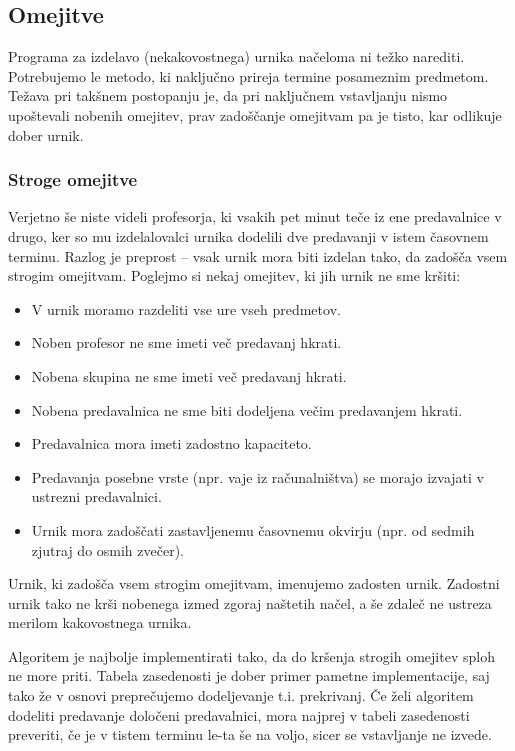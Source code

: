 \documentclass[a4paper,10pt]{article}
\begin{document}
\subsection{Omejitve }

Programa za izdelavo (nekakovostnega) urnika načeloma ni težko narediti. Potrebujemo
le metodo, ki naključno prireja termine posameznim predmetom. Težava pri takšnem postopanju
je, da pri naključnem vstavljanju nismo upoštevali nobenih omejitev, prav zadoščanje omejitvam
pa je tisto, kar odlikuje dober urnik.

 \subsubsection {Stroge omejitve}

Verjetno še niste videli profesorja, ki vsakih pet minut teče iz ene predavalnice v drugo,
ker so mu izdelalovalci urnika dodelili dve predavanji v istem časovnem terminu. Razlog
je preprost -- vsak urnik mora biti izdelan tako, da zadošča vsem strogim omejitvam.
Poglejmo si nekaj omejitev, ki jih urnik ne sme kršiti:

%
\begin{itemize}
   

   \item  V urnik moramo razdeliti vse ure vseh predmetov.
   \item  Noben profesor ne sme imeti več predavanj hkrati.
   \item  Nobena skupina ne sme imeti več predavanj hkrati.
   \item  Nobena predavalnica ne sme biti dodeljena večim predavanjem hkrati.
   \item  Predavalnica mora imeti zadostno kapaciteto.
   \item  Predavanja posebne vrste (npr. vaje iz računalništva) se morajo izvajati v ustrezni predavalnici.
   \item  Urnik mora zadoščati zastavljenemu časovnemu okvirju (npr. od sedmih zjutraj do osmih zvečer).
\end{itemize}
  


\noindent

Urnik, ki zadošča vsem strogim omejitvam, imenujemo zadosten urnik. Zadostni urnik tako ne
krši nobenega izmed zgoraj naštetih načel, a še zdaleč ne ustreza merilom kakovostnega urnika.

Algoritem je najbolje implementirati tako, da do kršenja strogih omejitev sploh ne more priti.
Tabela zasedenosti je dober primer pametne implementacije, saj tako že v osnovi  preprečujemo
dodeljevanje t.i. prekrivanj. Če želi algoritem dodeliti predavanje določeni predavalnici,
mora najprej v tabeli zasedenosti preveriti, če je v tistem terminu le-ta še na voljo,
sicer se vstavljanje ne izvede.
\end{document}
